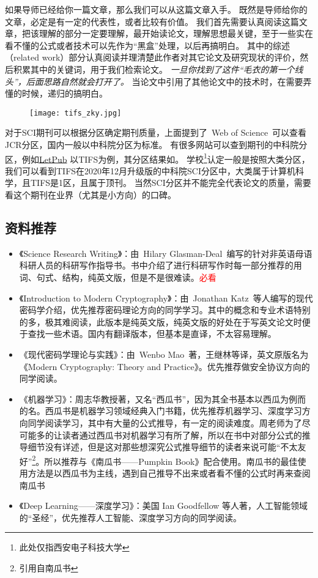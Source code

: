 \documentclass[lang=cn,11pt,a4paper]{elegantpaper}
\begin{document}
如果导师已经给你一篇文章，那么我们可以从这篇文章入手。
既然是导师给你的文章，必定是有一定的代表性，或者比较有价值。
我们首先需要认真阅读这篇文章，把该理解的部分一定要理解，最开始读论文，理解思想最关键，至于一些实在看不懂的公式或者技术可以先作为“黑盒”处理，以后再搞明白。
其中的综述（related work）部分认真阅读并理清楚此作者对其它论文及研究现状的评价，然后积累其中的关键词，用于我们检索论文。
\textit{一旦你找到了这件“毛衣的第一个线头”，后面思路自然就会打开了。}
当论文中引用了其他论文中的技术时，在需要弄懂的时候，递归的搞明白。

\begin{figure}[!htb]
\centering
\texttt{[image: tifs\_zky.jpg]}
\caption{}
\label{fig.tifs_zky}
\end{figure}
对于SCI期刊可以根据分区确定期刊质量，上面提到了~Web of Science~可以查看JCR分区，国内一般以中科院分区为标准。
有很多网站可以查到期刊的中科院分区，例如\href{http://www.letpub.com.cn/index.php?page=journalapp}{LetPub}
以TIFS为例，其分区结果如。
学校\footnote{此处仅指西安电子科技大学}认定一般是按照大类分区，我们可以看到TIFS在2020年12月升级版的中科院SCI分区中，大类属于计算机科学，且TIFS是1区，且属于顶刊。
当然SCI分区并不能完全代表论文的质量，需要看这个期刊在业界（尤其是小方向）的口碑。

\subsection{资料推荐}
\begin{itemize}
  \item 《Science Research Writing》：由~Hilary Glasman-Deal~编写的针对非英语母语科研人员的科研写作指导书。书中介绍了进行科研写作时每一部分推荐的用词、句式、结构，纯英文版，但是不是很难读。\textcolor{red}{必看}
  \item 《Introduction to Modern Cryptography》：由~Jonathan Katz~等人编写的现代密码学介绍，优先推荐密码理论方向的同学学习。其中的概念和专业术语特别的多，极其难阅读，此版本是纯英文版，纯英文版的好处在于写英文论文时便于查找一些术语。国内有翻译版本，但基本是直译，不太容易理解。
  \item 《现代密码学理论与实践》：由~Wenbo Mao~著，王继林等译，英文原版名为《Modern Cryptography: Theory and Practice》。优先推荐做安全协议方向的同学阅读。
  \item 《机器学习》：周志华教授著，又名“西瓜书”，因为其全书基本以西瓜为例而的名。西瓜书是机器学习领域经典入门书籍，优先推荐机器学习、深度学习方向同学阅读学习，其中有大量的公式推导，有一定的阅读难度。周老师为了尽可能多的让读者通过西瓜书对机器学习有所了解，所以在书中对部分公式的推导细节没有详述，但是这对那些想深究公式推导细节的读者来说可能“不太友好”\footnote{引用自南瓜书}。所以推荐与《南瓜书——Pumpkin Book》配合使用。南瓜书的最佳使用方法是以西瓜书为主线，遇到自己推导不出来或者看不懂的公式时再来查阅南瓜书
  \item 《Deep Learning——深度学习》：美国 Ian Goodfellow 等人著，人工智能领域的“圣经”，优先推荐人工智能、深度学习方向的同学阅读。
\end{itemize}
\end{document}

